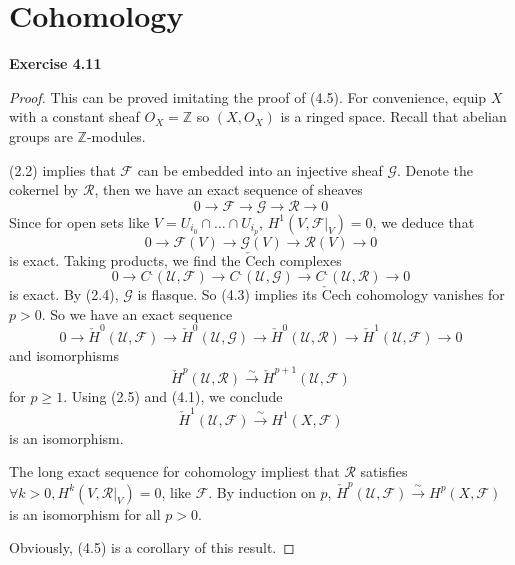 \documentclass{article}
\begin{document}
\section{Cohomology}
\textbf{Exercise 4.11} 
\begin{proof}
This can be proved imitating the proof of (4.5). For convenience, equip $X$ with a constant sheaf $O_X = \mathbb{Z}$ so $(X, O_X)$ is a ringed space. Recall that abelian groups are $\mathbb{Z}$-modules.

(2.2) implies that $\mathscr{F}$ can be embedded into an injective sheaf $\mathscr{G}$. Denote the cokernel by $\mathscr{R}$, then we have an exact sequence of sheaves
\[
0 \longrightarrow \mathscr{F} \longrightarrow \mathscr{G} \longrightarrow \mathscr{R} \longrightarrow 0
\]
Since for open sets like $V = U_{i_0} \cap \dots \cap  U_{i_p}$, $H^1(V, \mathscr{F}|_V) = 0$, we deduce that
\[
0 \longrightarrow \mathscr{F}(V) \longrightarrow \mathscr{G}(V) \longrightarrow \mathscr{R}(V) \longrightarrow 0
\]
is exact. Taking products, we find the $\check{\mathrm{C}}$ech complexes
\[
0 \longrightarrow C^.(\mathcal{U}, \mathscr{F}) \longrightarrow C^.(\mathcal{U}, \mathscr{G}) \longrightarrow C^.(\mathcal{U}, \mathscr{R}) \longrightarrow 0
\]
is exact. By (2.4), $\mathscr{G}$ is flasque. So (4.3) implies its $\check{\mathrm{C}}$ech cohomology vanishes for $p > 0$. So we have an exact sequence
\[
0 \longrightarrow \check{H}^0(\mathcal{U}, \mathscr{F}) \longrightarrow \check{H}^0(\mathcal{U}, \mathscr{G}) \longrightarrow \check{H}^0(\mathcal{U}, \mathscr{R}) \longrightarrow \check{H}^1(\mathcal{U}, \mathscr{F})  \longrightarrow 0
\]
and isomorphisms
\[
\check{H}^p(\mathcal{U}, \mathscr{R}) \xrightarrow{\sim} \check{H}^{p+1}(\mathcal{U}, \mathscr{F})
\]
for $p \geq 1$. Using (2.5) and (4.1), we conclude
\[
\check{H}^1(\mathcal{U}, \mathscr{F}) \xrightarrow{\sim} H^{1}(X, \mathscr{F})
\]
is an isomorphism.

The long exact sequence for cohomology impliest that $\mathscr{R}$ satisfies $\forall k > 0, H^k(V, \mathscr{R}|_V) = 0$, like $\mathscr{F}$. By induction on $p$, $\check{H}^p(\mathcal{U}, \mathscr{F}) \xrightarrow{\sim} H^{p}(X, \mathscr{F})$ is an isomorphism for all $p > 0$.

Obviously, (4.5) is a corollary of this result.
\end{proof}




\end{document}
